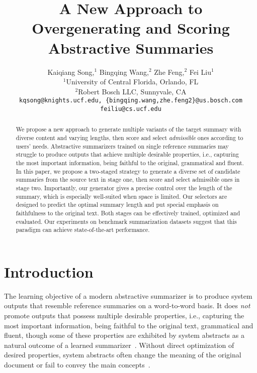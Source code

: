 \documentclass[11pt]{article}
\title{A New Approach to Overgenerating and Scoring Abstractive Summaries}
\author{
Kaiqiang Song,$^1$
Bingqing Wang,$^2$
Zhe Feng,$^2$
Fei Liu$^1$\\[0.5em]
$^1$University of Central Florida, Orlando, FL\\
$^2$Robert Bosch LLC, Sunnyvale, CA\\[0.5em]
\texttt{kqsong@knights.ucf.edu, \{bingqing.wang,zhe.feng2\}@us.bosch.com}\\
\texttt{feiliu@cs.ucf.edu}\\
}
\begin{document}
\maketitle
\begin{abstract}

We propose a new approach to generate multiple variants of the target summary with diverse content and varying lengths, then score and select \emph{admissible} ones according to users' needs.
Abstractive summarizers trained on single reference summaries may struggle to produce outputs that achieve multiple desirable properties, i.e., capturing the most important information, being faithful to the original, grammatical and fluent.
In this paper, we propose a two-staged strategy to generate a diverse set of candidate summaries from the source text in stage one, then score and select admissible ones in stage two. 
Importantly, our generator gives a precise control over the length of the summary, which is especially well-suited when space is limited.
Our selectors are designed to predict the optimal summary length and put special emphasis on faithfulness to the original text.
Both stages can be effectively trained, optimized and evaluated.
Our experiments on benchmark summarization datasets suggest that this paradigm can achieve state-of-the-art performance.


\end{abstract}


\section{Introduction}
\label{sec:intro}

The learning objective of a modern abstractive summarizer is to produce system outputs that resemble reference summaries on a word-to-word basis.
It does \emph{not} promote outputs that possess multiple desirable properties, i.e., capturing the most important information, being faithful to the original text, grammatical and fluent, though some of these properties are exhibited by system abstracts as a natural outcome of a learned summarizer~\cite{see-etal-2017-get,takase-etal-2016-neural,tan-etal-2017-abstractive,chen-bansal-2018-fast,celikyilmaz-etal-2018-deep,gehrmann-etal-2018-bottom,liu-lapata-2019-hierarchical,lebanoff-etal-2019-scoring,fabbri-etal-2019-multi,brazinskas-etal-2020-shot}.
Without direct optimization of desired properties, system abstracts often change the meaning of the original document or fail to convey the main concepts~\cite{kryscinski-etal-2020-evaluating}. 
\end{document}
